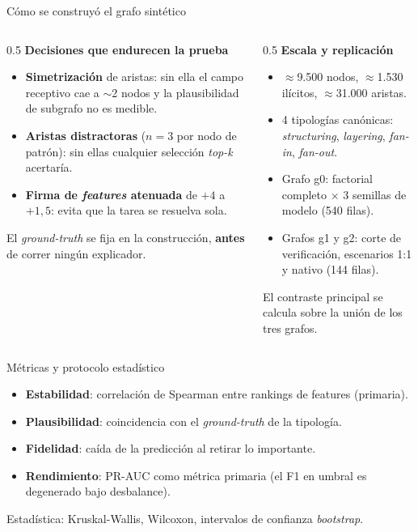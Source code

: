 \documentclass[aspectratio=169,10pt]{beamer}
\begin{document}
\begin{frame}{Cómo se construyó el grafo sintético}
\begin{columns}[T]
\begin{column}{0.5\textwidth}
\footnotesize
\textbf{Decisiones que endurecen la prueba}
\begin{itemize}
  \item \textbf{Simetrización} de aristas: sin ella el campo receptivo cae a $\sim$2 nodos y la plausibilidad de subgrafo no es medible.
  \item \textbf{Aristas distractoras} ($n=3$ por nodo de patrón): sin ellas cualquier selección \textit{top-k} acertaría.
  \item \textbf{Firma de \textit{features} atenuada} de $+4$ a $+1{,}5$: evita que la tarea se resuelva sola.
\end{itemize}
\vspace{3pt}
{\color{muted}El \textit{ground-truth} se fija en la construcción, \textbf{antes} de correr ningún explicador.}
\end{column}
\begin{column}{0.5\textwidth}
\footnotesize
\textbf{Escala y replicación}
\begin{itemize}
  \item $\approx$9.500 nodos, $\approx$1.530 ilícitos, $\approx$31.000 aristas.
  \item 4 tipologías canónicas: \textit{structuring}, \textit{layering}, \textit{fan-in}, \textit{fan-out}.
  \item Grafo g0: factorial completo $\times$ 3 semillas de modelo (540 filas).
  \item Grafos g1 y g2: corte de verificación, escenarios 1:1 y nativo (144 filas).
\end{itemize}
\vspace{3pt}
{\color{muted}El contraste principal se calcula sobre la unión de los tres grafos.}
\end{column}
\end{columns}
\end{frame}

\begin{frame}{Métricas y protocolo estadístico}
\begin{itemize}
  \item \textbf{\color{teal}Estabilidad}: correlación de Spearman entre rankings de features (primaria).
  \item \textbf{\color{seafoam}Plausibilidad}: coincidencia con el \textit{ground-truth} de la tipología.
  \item \textbf{\color{amber}Fidelidad}: caída de la predicción al retirar lo importante.
  \item \textbf{\color{coral}Rendimiento}: PR-AUC como métrica primaria (el F1 en umbral es degenerado bajo desbalance).
\end{itemize}
\vspace{3pt}
\small Estadística: Kruskal-Wallis, Wilcoxon, intervalos de confianza \textit{bootstrap}.
\end{frame}
\end{document}
